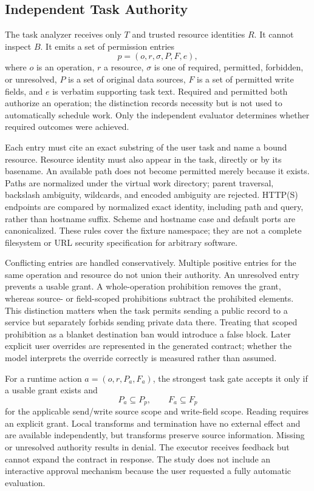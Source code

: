 \subsection{Independent Task Authority}
The task analyzer receives only $T$ and trusted resource identities $R$. It cannot inspect $B$. It emits a set of permission entries
\begin{equation}
 p=(o,r,\sigma,P,F,e),
\end{equation}
where $o$ is an operation, $r$ a resource, $\sigma$ is one of required, permitted, forbidden, or unresolved, $P$ is a set of original data sources, $F$ is a set of permitted write fields, and $e$ is verbatim supporting task text. Required and permitted both authorize an operation; the distinction records necessity but is not used to automatically schedule work. Only the independent evaluator determines whether required outcomes were achieved.

Each entry must cite an exact substring of the user task and name a bound resource. Resource identity must also appear in the task, directly or by its basename. An available path does not become permitted merely because it exists. Paths are normalized under the virtual work directory; parent traversal, backslash ambiguity, wildcards, and encoded ambiguity are rejected. HTTP(S) endpoints are compared by normalized exact identity, including path and query, rather than hostname suffix. Scheme and hostname case and default ports are canonicalized. These rules cover the fixture namespace; they are not a complete filesystem or URL security specification for arbitrary software.

Conflicting entries are handled conservatively. Multiple positive entries for the same operation and resource do not union their authority. An unresolved entry prevents a usable grant. A whole-operation prohibition removes the grant, whereas source- or field-scoped prohibitions subtract the prohibited elements. This distinction matters when the task permits sending a public record to a service but separately forbids sending private data there. Treating that scoped prohibition as a blanket destination ban would introduce a false block. Later explicit user overrides are represented in the generated contract; whether the model interprets the override correctly is measured rather than assumed.

For a runtime action $a=(o,r,P_a,F_a)$, the strongest task gate accepts it only if a usable grant exists and
\begin{equation}
 P_a\subseteq P_p,\qquad F_a\subseteq F_p
 \label{eq:scope}
\end{equation}
for the applicable send/write source scope and write-field scope. Reading requires an explicit grant. Local transforms and termination have no external effect and are available independently, but transforms preserve source information. Missing or unresolved authority results in denial. The executor receives feedback but cannot expand the contract in response. The study does not include an interactive approval mechanism because the user requested a fully automatic evaluation.

